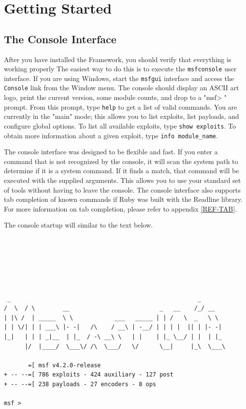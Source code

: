 \documentclass{report}
\begin{document}
\pagebreak

\chapter{Getting Started}

    \section{The Console Interface}
    \label{STARTED-CONSOLE}

\par
After you have installed the Framework, you should verify that everything is
working properly  The easiest way to do this is to execute the
\texttt{msfconsole} user interface. If you are using Windows, start the \texttt{msfgui}
interface and access the \texttt{Console} link from the Window menu.
The console should display an ASCII art logo, print the current version, some module
counts, and drop to a "msf> " prompt. From this prompt, type \texttt{help} to get a list of
valid commands. You are currently in the "main" mode; this allows you to list
exploits, list payloads, and configure global options.  To list all available
exploits, type \texttt{show exploits}. To obtain more information about a given
exploit, type \texttt{info module\_name}. 

\par
The console interface was designed to be flexible and fast. If you
enter a command that is not recognized by the console, it will scan the system
path to determine if it is a system command. If it finds a match, that command will be
executed with the supplied arguments. This allows you to use your standard set of tools
without having to leave the console. The console interface also supports tab completion of
known commands if Ruby was built with the Readline library. For more information on tab
completion, please refer to appendix \ref{REF-TAB}.

\par
The console startup will similar to the text below.

\begin{verbatim}






 _                                                      _
/  \  / \        __                          _   __    /_/ __
| |\ /  | _____  \ \            ___   _____ | | /   \  _   \ \
| | \/| | | ___\ |- -|   /\    / __\ | -__/ | | | |  || | |- -|
|_|   | | | _|__  | |_  / -\ __\ \   | |    | |_ \__/ | |  | |_
      |/  |____/  \___\/ /\  \___/   \/      \__|     |_\  \___\

       =[ msf v4.2.0-release
+ -- --=[ 786 exploits - 424 auxiliary - 127 post
+ -- --=[ 238 payloads - 27 encoders - 8 ops

msf >            
\end{verbatim}
\end{document}
